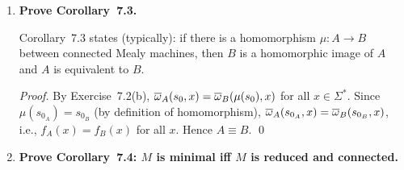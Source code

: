 \begin{enumerate}[{7.}1.]
\begin{enumerate}[(a)]
  \item \textbf{Prove $\mu(\DBAR_A(s,x))=\DBAR_B(\mu(s),x)$.}

  \begin{proof}
  By induction on $|x|$.

  \emph{Base:} $\mu(\DBAR_A(s,\lambda))=\mu(s)=\DBAR_B(\mu(s),\lambda)$.

  \emph{Step:}  $\mu(\DBAR_A(s,x\pmb{a}))=\mu(\delta_A(\DBAR_A(s,x),\pmb{a}))=\delta_B(\mu(\DBAR_A(s,x)),\pmb{a})=\delta_B(\DBAR_B(\mu(s),x),\pmb{a})=\DBAR_B(\mu(s),x\pmb{a})$.
  (Used: $\mu(\delta_A(t,\pmb{a}))=\delta_B(\mu(t),\pmb{a})$ for all $t\in S_A$---homomorphism property.) \qed
  \end{proof}

  \item \textbf{Prove $\OBAR_A(s,x)=\OBAR_B(\mu(s),x)$.}

  \begin{proof}
  By induction on $|x|$.

  \emph{Base:} $\OBAR_A(s,\lambda)=\lambda=\OBAR_B(\mu(s),\lambda)$.

  \emph{Step:}  $\OBAR_A(s,x\pmb{a})=\OBAR_A(s,x)\cdot\omega_A(\DBAR_A(s,x),\pmb{a})$.
  By induction: $=\OBAR_B(\mu(s),x)\cdot\omega_A(\DBAR_A(s,x),\pmb{a})$.
  By homomorphism: $\omega_A(t,\pmb{a})=\omega_B(\mu(t),\pmb{a})$ for all $t$; so:
  $=\OBAR_B(\mu(s),x)\cdot\omega_B(\mu(\DBAR_A(s,x)),\pmb{a})=\OBAR_B(\mu(s),x)\cdot\omega_B(\DBAR_B(\mu(s),x),\pmb{a})=\OBAR_B(\mu(s),x\pmb{a})$. \qed
  \end{proof}
\end{enumerate}

\item \textbf{Prove Corollary~7.3.}

Corollary~7.3 states (typically): if there is a homomorphism $\mu:A\to B$ between connected Mealy machines, then $B$ is a homomorphic image of $A$ and $A$ is equivalent to $B$.

\begin{proof}
By Exercise~7.2(b), $\overline{\omega}_A(s_0,x)=\overline{\omega}_B(\mu(s_0),x)$ for all $x\in\Sigma^*$.  Since $\mu(s_{0_A})=s_{0_B}$ (by definition of homomorphism), $\overline{\omega}_A(s_{0_A},x)=\overline{\omega}_B(s_{0_B},x)$, i.e., $f_A(x)=f_B(x)$ for all $x$.  Hence $A\equiv B$. \qed
\end{proof}

\item \textbf{Prove Corollary~7.4: $M$ is minimal iff $M$ is reduced and connected.}


\end{enumerate}
